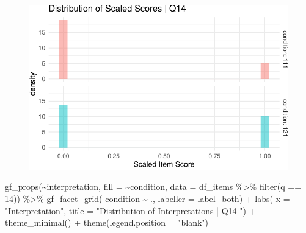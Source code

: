 \documentclass[
  letterpaper,
  DIV=11,
  numbers=noendperiod]{scrreprt}
\newenvironment{Shaded}{\begin{snugshade}}{\end{snugshade}}
\newcommand{\AttributeTok}[1]{\textcolor[rgb]{0.40,0.45,0.13}{#1}}
\newcommand{\DecValTok}[1]{\textcolor[rgb]{0.68,0.00,0.00}{#1}}
\newcommand{\FunctionTok}[1]{\textcolor[rgb]{0.28,0.35,0.67}{#1}}
\newcommand{\NormalTok}[1]{\textcolor[rgb]{0.00,0.23,0.31}{#1}}
\newcommand{\SpecialCharTok}[1]{\textcolor[rgb]{0.37,0.37,0.37}{#1}}
\newcommand{\StringTok}[1]{\textcolor[rgb]{0.13,0.47,0.30}{#1}}
\begin{document}
\begin{figure}[H]

{\centering \includegraphics{analysis/SGC3A/2_sgc3A_scoring_files/figure-pdf/Q14-distribution-1.pdf}

}

\end{figure}

\begin{Shaded}
\begin{Highlighting}[]
\FunctionTok{gf\_props}\NormalTok{(}\SpecialCharTok{\textasciitilde{}}\NormalTok{interpretation, }\AttributeTok{fill =} \SpecialCharTok{\textasciitilde{}}\NormalTok{condition, }\AttributeTok{data =}\NormalTok{ df\_items }\SpecialCharTok{\%\textgreater{}\%} \FunctionTok{filter}\NormalTok{(q }\SpecialCharTok{==} \DecValTok{14}\NormalTok{)) }\SpecialCharTok{\%\textgreater{}\%}
  \FunctionTok{gf\_facet\_grid}\NormalTok{( condition }\SpecialCharTok{\textasciitilde{}}\NormalTok{ ., }\AttributeTok{labeller =}\NormalTok{ label\_both) }\SpecialCharTok{+} 
  \FunctionTok{labs}\NormalTok{( }\AttributeTok{x =} \StringTok{"Interpretation"}\NormalTok{, }\AttributeTok{title =} \StringTok{"Distribution of Interpretations | Q14 "}\NormalTok{) }\SpecialCharTok{+} 
  \FunctionTok{theme\_minimal}\NormalTok{() }\SpecialCharTok{+} \FunctionTok{theme}\NormalTok{(}\AttributeTok{legend.position =} \StringTok{"blank"}\NormalTok{)}
\end{Highlighting}
\end{Shaded}
\end{document}
